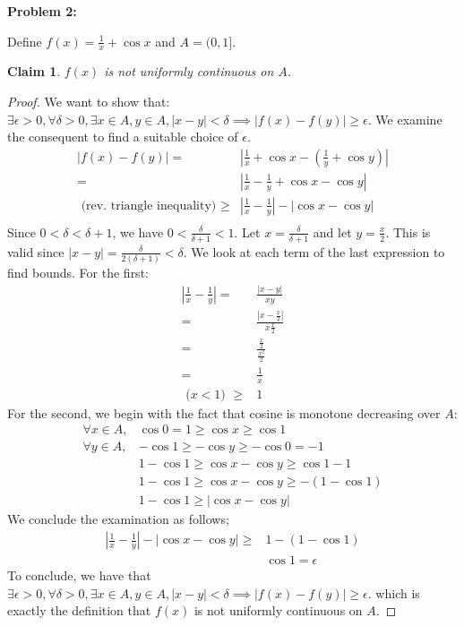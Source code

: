 \documentclass{article}
\newcommand{\eps}{\ensuremath{\epsilon}}
\newcommand{\pt}[1]{\textrm{ #1 }}
\newtheorem{clm}{Claim}
\begin{document}
\textbf{Problem 2:}

Define $f(x) = \frac{1}{x} + \cos x$ and $A = (0,1]$.

\begin{clm}
	$f(x)$ is not uniformly continuous on $A$.
\end{clm}

\begin{proof}
	We want to show that:
	$\exists \eps > 0,
	\forall \delta > 0,
	\exists x \in A, y \in A,
	|x - y| < \delta
	\implies |f(x) - f(y)| \geq \eps$.
	We examine the consequent to find a suitable choice of $\eps$.
	\begin{align}
		|f(x) - f(y)| = & |\frac{1}{x} + \cos x - (\frac{1}{y} + \cos y)| \\
		= & |\frac{1}{x} - \frac{1}{y} + \cos x - \cos y| \\
		\pt{(rev. triangle inequality)} \ge & |\frac{1}{x} - \frac{1}{y}| - |\cos x - \cos y| \\
	\end{align}
	Since $0 < \delta < \delta + 1$, we have $0 < \frac{\delta}{\delta + 1} < 1$.
	Let $x = \frac{\delta}{\delta + 1}$ and let $y = \frac{x}{2}$.
	This is valid since $|x - y| = \frac{\delta}{2(\delta + 1)} < \delta$.
	We look at each term of the last expression to find bounds.
	For the first:
	\begin{align}
		|\frac{1}{x} - \frac{1}{y}| = & \frac{|x - y|}{xy} \\
		= & \frac{|x - \frac{x}{2}|}{x\frac{x}{2}} \\
		= & \frac{\frac{x}{2}}{\frac{x^2}{2}} \\
		= & \frac{1}{x} \\
		\pt{($x < 1$)} \geq & 1
	\end{align}
	For the second, we begin with the fact that cosine is monotone decreasing over $A$:
	\begin{align}
		\forall x \in A, & \cos 0  = 1 \geq \cos x \geq \cos 1 \\
		\forall y \in A, & -\cos 1 \geq -\cos y \geq -\cos 0 =  -1 \\
				 & 1 - \cos 1 \geq \cos x - \cos y \geq \cos 1 - 1 \\
				 & 1 - \cos 1 \geq \cos x - \cos y \geq -(1 - \cos 1)  \\
				 & 1 - \cos 1 \geq |\cos x - \cos y|
	\end{align}
	We conclude the examination as follows;
	\begin{align}
		|\frac{1}{x} - \frac{1}{y}| - |\cos x - \cos y| \geq & 1 - (1 - \cos 1) \\
								     & \cos 1 = \eps
	\end{align}
	To conclude, we have that
	$\exists \eps > 0,
	\forall \delta > 0,
	\exists x \in A, y \in A,
	|x - y| < \delta
	\implies |f(x) - f(y)| \geq \eps$.
	which is exactly the definition that
	$f(x)$ is not uniformly continuous on $A$.
\end{proof}
\end{document}
